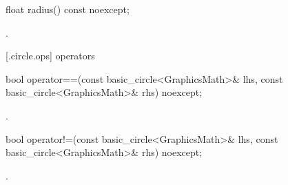 %
\begin{itemdecl}
float radius() const noexcept;
\end{itemdecl}
\begin{itemdescr}
\pnum
\returns
{}.
\end{itemdescr}

 [\iotwod.circle.ops] { operators}

%
\begin{itemdecl}
bool operator==(const basic_circle<GraphicsMath>& lhs,
  const basic_circle<GraphicsMath>& rhs) noexcept;
\end{itemdecl}
\begin{itemdescr}
\pnum
\returns
{}.
\end{itemdescr}

%
\begin{itemdecl}
bool operator!=(const basic_circle<GraphicsMath>& lhs,
  const basic_circle<GraphicsMath>& rhs) noexcept;
\end{itemdecl}
\begin{itemdescr}
\pnum
\returns
{}.
\end{itemdescr}

